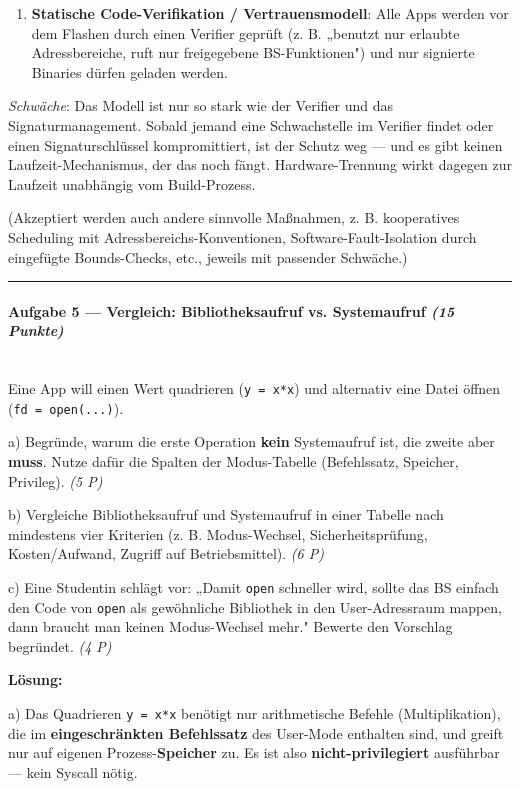 \documentclass[11pt, a4paper]{article}
\begin{document}
\begin{enumerate}
  \item \textbf{Statische Code-Verifikation / Vertrauensmodell}: Alle Apps werden vor dem Flashen durch einen Verifier geprüft (z. B. „benutzt nur erlaubte Adressbereiche, ruft nur freigegebene BS-Funktionen") und nur signierte Binaries dürfen geladen werden.
\end{enumerate}
\textit{Schwäche}: Das Modell ist nur so stark wie der Verifier und das Signaturmanagement. Sobald jemand eine Schwachstelle im Verifier findet oder einen Signaturschlüssel kompromittiert, ist der Schutz weg — und es gibt keinen Laufzeit-Mechanismus, der das noch fängt. Hardware-Trennung wirkt dagegen zur Laufzeit unabhängig vom Build-Prozess.


(Akzeptiert werden auch andere sinnvolle Maßnahmen, z. B. kooperatives Scheduling mit Adressbereichs-Konventionen, Software-Fault-Isolation durch eingefügte Bounds-Checks, etc., jeweils mit passender Schwäche.)



\noindent\textcolor{rulegray}{\rule{\linewidth}{0.4pt}}


\paragraph{Aufgabe 5 — Vergleich: Bibliotheksaufruf vs. Systemaufruf \textit{(15 Punkte)}}\mbox{}\\[2pt]

Eine App will einen Wert quadrieren (\texttt{y = x*x}) und alternativ eine Datei öffnen (\texttt{fd = open(...)}).


a) Begründe, warum die erste Operation \textbf{kein} Systemaufruf ist, die zweite aber \textbf{muss}. Nutze dafür die Spalten der Modus-Tabelle (Befehlssatz, Speicher, Privileg). \textit{(5 P)}


b) Vergleiche Bibliotheksaufruf und Systemaufruf in einer Tabelle nach mindestens vier Kriterien (z. B. Modus-Wechsel, Sicherheitsprüfung, Kosten/Aufwand, Zugriff auf Betriebsmittel). \textit{(6 P)}


c) Eine Studentin schlägt vor: „Damit \texttt{open} schneller wird, sollte das BS einfach den Code von \texttt{open} als gewöhnliche Bibliothek in den User-Adressraum mappen, dann braucht man keinen Modus-Wechsel mehr." Bewerte den Vorschlag begründet. \textit{(4 P)}


\textbf{Lösung:}


a) Das Quadrieren \texttt{y = x*x} benötigt nur arithmetische Befehle (Multiplikation), die im \textbf{eingeschränkten Befehlssatz} des User-Mode enthalten sind, und greift nur auf eigenen Prozess-\textbf{Speicher} zu. Es ist also \textbf{nicht-privilegiert} ausführbar — kein Syscall nötig.
\end{document}

